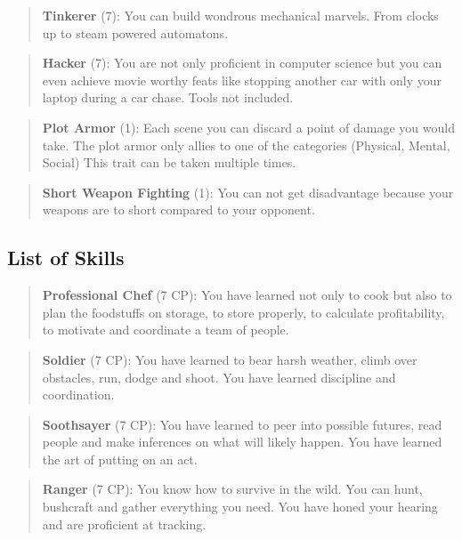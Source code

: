 \documentclass[11pt]{article}
\begin{document}
{\begin{multicols}{2}[]
\begin{quote}
\textbf{Tinkerer} (7): You can build wondrous mechanical marvels. From clocks up to steam powered automatons. 
\end{quote}

\begin{quote}
\textbf{Hacker} (7): You are not only proficient in computer science but you can even achieve movie worthy feats like stopping another car with only your laptop during a car chase. Tools not included.
\end{quote}

\begin{quote}
\textbf{Plot Armor} (1): Each scene you can discard a point of damage you would take. The plot armor only allies to one of the categories (Physical, Mental, Social) This trait can be taken multiple times.
\end{quote}

\begin{quote}
\textbf{Short Weapon Fighting} (1): You can not get disadvantage because your weapons are to short compared to your opponent.
\end{quote}


\subsection{List of Skills}
\label{sec:org1dedbd6}
\begin{quote}
\textbf{Professional Chef} (7 CP): You have learned not only to cook but also to plan the foodstuffs on storage, to store properly, to calculate profitability, to motivate and coordinate a team of people.
\end{quote}

\begin{quote}
\textbf{Soldier} (7 CP): You have learned to bear harsh weather, climb over obstacles, run, dodge and shoot. You have learned discipline and coordination.
\end{quote}

\begin{quote}
\textbf{Soothsayer} (7 CP): You have learned to peer into possible futures, read people and make inferences on what will likely happen. You have learned the art of putting on an act. 
\end{quote}

\begin{quote}
\textbf{Ranger} (7 CP): You know how to survive in the wild. You can hunt, bushcraft and gather everything you need. You have honed your hearing and are proficient at tracking.
\end{quote}


\end{multicols}}
\end{document}
